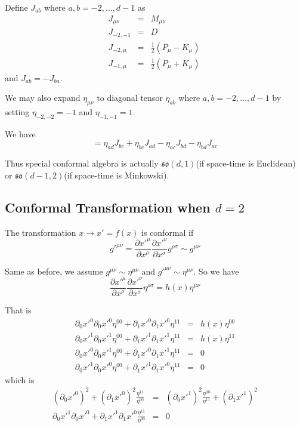 \documentclass[12pt]{book}
\begin{document}
	Define $J_{ab}$ where $a,b=-2,\dots,d-1$ as
	\begin{eqnarray}
		J_{\mu\nu}&=&M_{\mu\nu}\\
		J_{-2,-1}&=&D\\
		J_{-2,\mu}&=&\frac 12(P_\mu-K_\mu)\\
		J_{-1,\mu}&=&\frac 12(P_\mu+K_\mu)\
	\end{eqnarray}
	and $J_{ab}=-J_{ba}$.
	
	We may also expand $\eta_{\mu\nu}$ to diagonal tensor $\eta_{ab}$ where $a,b=-2,\dots,d-1$ by setting $\eta_{-2,-2}=-1$ and $\eta_{-1,-1}=1$.
	
	We have
	\begin{equation}
		[J_{ab},J_{cd}]=\eta_{ad}J_{bc}+\eta_{bc}J_{ad}-\eta_{ac}J_{bd}-\eta_{bd}J_{ac}
	\end{equation}
	
	Thus special conformal algebra is actually $\mathfrak{so}(d,1)$(if space-time is Euclidean) or $\mathfrak{so}(d-1,2)$(if space-time is Minkowski).
	
	\subsection{Conformal Transformation when $d=2$}
	
	The transformation $x\rightarrow x'=f(x)$ is conformal if
	\begin{equation}
		g'^{\mu\nu}=\frac{\partial x'^\mu}{\partial x^\rho}\frac{\partial x'^\nu}{\partial x^\sigma}g^{\rho\sigma}\sim g^{\mu\nu}
	\end{equation}
	
	Same as before, we assume $g^{\mu\nu}\sim\eta^{\mu\nu}$ and $g'^{\mu\nu}\sim\eta^{\mu\nu}$. So we have
	\begin{equation}
		\frac{\partial x'^\mu}{\partial x^\rho}\frac{\partial x'^\nu}{\partial x^\sigma}\eta^{\rho\sigma}=h(x)\eta^{\mu\nu}
	\end{equation}
	
	That is
	\begin{eqnarray}
		\partial_0 x'^0\partial_0 x'^0\eta^{00}+\partial_1 x'^0\partial_1 x'^0\eta^{11}&=&h(x)\eta^{00}\\
		\partial_0 x'^1\partial_0 x'^1\eta^{00}+\partial_1 x'^1\partial_1 x'^1\eta^{11}&=&h(x)\eta^{11}\\
		\partial_0 x'^0\partial_0 x'^1\eta^{00}+\partial_1 x'^0\partial_1 x'^1\eta^{11}&=&0\\
		\partial_0 x'^1\partial_0 x'^0\eta^{00}+\partial_1 x'^1\partial_1 x'^0\eta^{11}&=&0
	\end{eqnarray}
	which is
	\begin{eqnarray}
		(\partial_0 x'^0)^2+(\partial_1 x'^0)^2\frac{\eta^{11}}{\eta^{00}}&=&(\partial_0 x'^1)^2\frac{\eta^{00}}{\eta^{11}}+(\partial_1 x'^1)^2\\
		\partial_0 x'^1\partial_0 x'^0+\partial_1 x'^1\partial_1 x'^0\frac{\eta^{11}}{\eta^{00}}&=&0
	\end{eqnarray}
	
\end{document}
